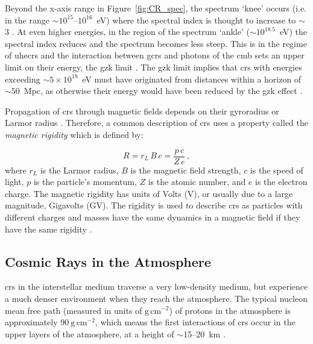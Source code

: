 Beyond the x-axis range in Figure~\ref{fig:CR_spec}, the spectrum `knee' occurs (i.e. in the range $\sim10^{15}$--$10^{16}$~eV) where the spectral index is thought to increase to $\sim$3 \citep{particle_data_group_review_2020}. At even higher energies, in the region of the spectrum `ankle' ($\sim$$10^{18.5}$~eV) the spectral index reduces and the spectrum becomes less steep. This is in the regime of \glspl{uhecr} and the interaction between \glspl{gcr} and photons of the \gls{cmb} sets an upper limit on their energy, the \gls{gzk} limit \citep{particle_data_group_review_2020}. The \gls{gzk} limit implies that \glspl{cr} with energies exceeding $\sim5\times10^{19}$~eV must have originated from distances within a horizon of $\sim50$~Mpc, as otherwise their energy would have been reduced by the \gls{gzk} effect \citep{particle_data_group_review_2020}. 


Propagation of \glspl{cr} through magnetic fields depends on their gyroradius or Larmor radius \citep{particle_data_group_review_2020}. Therefore, a common description of \glspl{cr} uses a property called the {\textit{magnetic rigidity}} which is defined by:

\begin{equation}
\label{eq:rigidity}
R = r_L \, B \, c = \frac{p \, c}{Z \, e} \, ,
\end{equation}
%
where $r_L$ is the Larmor radius, $B$ is the magnetic field strength, $c$ is the speed of light, $p$ is the particle's momentum, $Z$ is the atomic number, and $e$ is the electron charge. The magnetic rigidity has units of Volts (V), or usually due to a large magnitude, Gigavolts (GV). The rigidity is used to describe \glspl{cr} as particles with different charges and masses have the same dynamics in a magnetic field if they have the same rigidity \citep{particle_data_group_review_2020}.



\subsection{Cosmic Rays in the Atmosphere}
\label{sec:air_shower}

\glspl{cr} in the interstellar medium traverse a very low-density medium, but experience a much denser environment when they reach the atmosphere. The typical nucleon mean free path (measured in units of $\mathrm{g}\,\mathrm{cm}^{-2}$) of protons in the atmosphere is approximately $90~\mathrm{g}\,\mathrm{cm}^{-2}$, which means the first interactions of \glspl{cr} occur in the upper layers of the atmosphere, at a height of $\sim$15--20~km \citep{grupen_astroparticle_2005}. %

